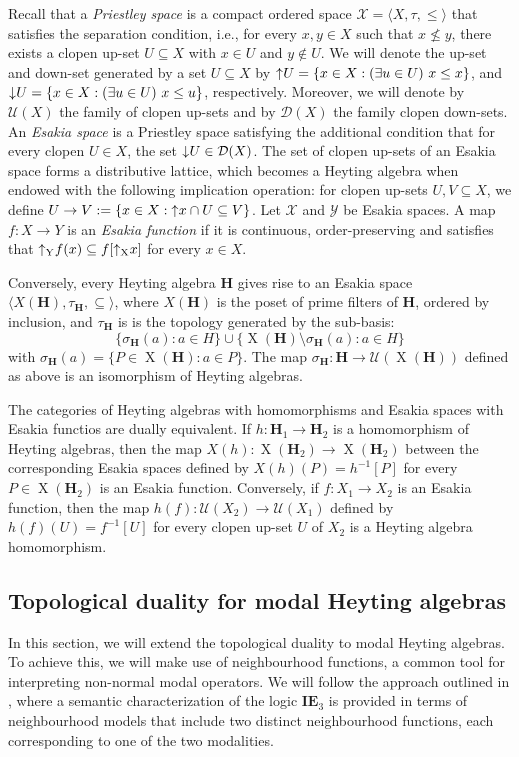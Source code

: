 \documentclass[pdflatex,sn-mathphys-num]{sn-jnl}%
\newcommand{\He}{\mathbf{H}}
\newcommand{\X}[1]{\operatorname{X}(#1)}
\newcommand{\da}[1]{\operatorname{\downarrow}\hspace{-0.5mm}{#1}}
\newcommand{\ua}[1]{\operatorname{\uparrow}\hspace{-0.5mm}{#1}}
\newcommand{\uaY}[1]{\operatorname{\uparrow_Y}\hspace{-0.5mm}{#1}}
\newcommand{\uaX}[1]{\operatorname{\uparrow_X}\hspace{-0.5mm}{#1}}
\theoremstyle{thmstyleone}%
\theoremstyle{thmstyletwo}%
\theoremstyle{thmstylethree}%
\begin{document}
Recall that a \emph{Priestley space} is a compact ordered space $\mathcal{X} = \langle X, \tau, \leq \rangle$ that satisfies the separation condition, i.e., for every $x,y \in X$ such that $x \not\leq y$, there exists a clopen up-set $U \subseteq X$ with $x \in U$ and $y \not\in U$. 
We will denote the up-set and down-set generated by a set $U\subseteq X$ by $\ua{U} =\{x\in X:(\exists u\in U) \ x\leq x\}$, and $\da{U}=\{x\in X:(\exists u\in U) \ x\leq u\} $, respectively.
Moreover, we will denote by $\mathcal{U}(X)$ the family of clopen up-sets and by $\mathcal{D}(X)$ the family clopen down-sets. 
An \emph{Esakia space} is a Priestley space satisfying the additional condition that for every clopen $U \in X$, the set $\da{U}\in \mathcal{D}(X)$. The set of clopen up-sets of an Esakia space forms a distributive lattice, which becomes a Heyting algebra when endowed with the following implication operation: for clopen up-sets $U, V \subseteq X$, we define $U \to V := \{x \in X : \ua{x} \cap U \subseteq V\}$.
Let $\mathcal{X}$ and $\mathcal{Y}$ be Esakia spaces. A map $f \colon X\to Y$
is an \emph{Esakia function} if it is continuous, order-preserving and satisﬁes that $\uaY{f(x)}\subseteq f[\uaX{x}]$ for every
$x\in X$. 

Conversely, every Heyting algebra $\He$ gives rise to an Esakia space $\langle X(\He), \tau_\He, \subseteq \rangle$, where $X(\He)$ is the poset of prime filters of $\He$, ordered by inclusion, and $\tau_\He$ is is the topology generated by the sub-basis: $$\{\sigma_\He(a) : a \in H\} \cup \{\X{\He}\setminus \sigma_\He(a) : a \in H\}$$ with $\sigma_\He(a)= \{ P \in \X{\He} : a \in P \}$. The map $\sigma_\He: \He \to \mathcal{U}(\X{\He})$ defined as above is an isomorphism of Heyting algebras.



The categories of Heyting algebras with homomorphisms and Esakia spaces with Esakia functios are dually equivalent. If $h\colon \He_1\to \He_2$ is a homomorphism of Heyting algebras, then the map $X(h) \colon \X{\He_2}\to\X{\He_2}$
between the corresponding Esakia spaces deﬁned by $X(h)(P)=h^{-1}[P]$ for every $P\in \X{\He_2}$ is an Esakia function. Conversely, if $f \colon X_1\to X_2$ is an Esakia function, then the map $h(f) \colon \mathcal{U}(X_2)\to \mathcal{U}(X_1)$ deﬁned by $h(f)(U)=f^{-1}[U]$ for every clopen up-set $U$ of $X_2$ is a Heyting algebra homomorphism.

\subsection{Topological duality for modal Heyting algebras}
In this section, we will extend the topological duality to modal Heyting algebras. To achieve this, we will make use of neighbourhood functions, a common tool for interpreting non-normal modal operators. We will follow the approach outlined in \cite{Oli2020}, where a semantic characterization of the logic $\textbf{IE}_3$ is provided in terms of neighbourhood models that include two distinct neighbourhood functions, each corresponding to one of the two modalities.
\end{document}
